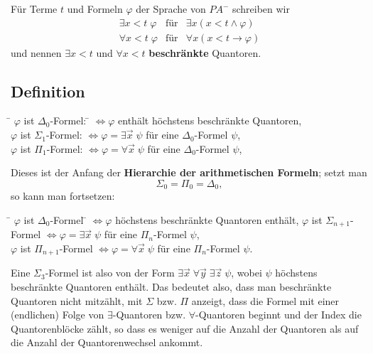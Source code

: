 Für Terme $t$ und Formeln $\varphi$ der Sprache von  $PA^-$ schreiben wir
\begin{eqnarray*}
\exists x < t \;  \varphi & \text{für} & \exists x (x < t \wedge \varphi)\\
\forall x < t \;  \varphi & \text{für} & \forall x (x < t \to \varphi)
\end{eqnarray*}
\noindent und nennen $\exists x < t$  und $\forall x < t$ {\bf beschränkte} Quantoren.

\subsection*{Definition}
\begin{tabbing}
\qquad \= $\varphi$ ist $\Delta_0$-Formel: \; \= $\iff \varphi$ enthält höchstens beschränkte Quantoren,\\
\> $\varphi$ ist $\Sigma_1$-Formel: \; \> $\iff \varphi = \exists \vec{x} \; \psi$ \; für eine $\Delta_0$-Formel $\psi$,\\
\> $\varphi$ ist $\Pi_1$-Formel: \; \>  $\iff \varphi = \forall \vec{x}  \;\psi$ \; für eine $\Delta_0$-Formel $\psi$,
\end{tabbing}
\noindent Dieses ist der Anfang der {\bf Hierarchie der arithmetischen Formeln}; setzt man
\begin{equation*}
\Sigma_0 = \Pi_0 = \Delta_0,
\end{equation*}
so kann man fortsetzen:

\begin{tabbing}
\qquad \quad \= $\varphi$ ist $\Delta_0$-Formel \quad  \=  $\iff \varphi$ höchstens beschränkte Quantoren enthält,\kill
\> $\varphi$ ist $\Sigma_{n+1}$-Formel \; \>  $\iff \varphi = \exists \vec{x} \; \psi$ \; für eine $\Pi_n$-Formel $\psi$,\\
\> $\varphi$ ist $\Pi_{n+1}$-Formel \; \>  $\iff \varphi = \forall \vec{x} \; \psi$ \; für eine $\Pi_n$-Formel $\psi$.
\end{tabbing}

Eine $\Sigma_3$-Formel ist also von der Form $\exists \vec{x} \; \forall \vec{y}\; \exists \vec{z} \; \psi$, wobei $\psi$ höchstens beschränkte Quantoren enthält. Das bedeutet also, dass man beschränkte Quantoren nicht mitzählt, mit $\Sigma$ bzw. $\Pi$ anzeigt, dass die Formel mit einer (endlichen) Folge von $\exists$-Quantoren bzw. $\forall$-Quantoren beginnt und der Index die Quantorenblöcke zählt, so dass es weniger auf die Anzahl der Quantoren als auf die Anzahl der Quantorenwechsel ankommt.

